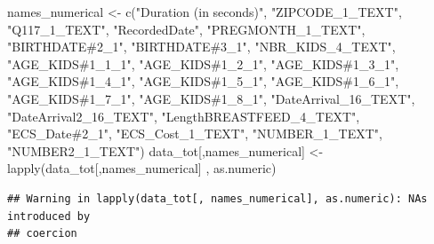 \documentclass[
]{article}
\newenvironment{Shaded}{}{}
\newcommand{\FunctionTok}[1]{\textcolor[rgb]{0.02,0.16,0.49}{#1}}
\newcommand{\NormalTok}[1]{#1}
\newcommand{\OtherTok}[1]{\textcolor[rgb]{0.00,0.44,0.13}{#1}}
\newcommand{\StringTok}[1]{\textcolor[rgb]{0.25,0.44,0.63}{#1}}
\begin{document}
\begin{Shaded}
\begin{Highlighting}[]
\NormalTok{names\_numerical }\OtherTok{\textless{}{-}} \FunctionTok{c}\NormalTok{(}\StringTok{"Duration (in seconds)"}\NormalTok{, }\StringTok{"ZIPCODE\_1\_TEXT"}\NormalTok{, }\StringTok{"Q117\_1\_TEXT"}\NormalTok{, }\StringTok{"RecordedDate"}\NormalTok{, }\StringTok{"PREGMONTH\_1\_TEXT"}\NormalTok{, }
                     \StringTok{"BIRTHDATE\#2\_1"}\NormalTok{, }\StringTok{"BIRTHDATE\#3\_1"}\NormalTok{, }\StringTok{"NBR\_KIDS\_4\_TEXT"}\NormalTok{, }\StringTok{"AGE\_KIDS\#1\_1\_1"}\NormalTok{, }\StringTok{"AGE\_KIDS\#1\_2\_1"}\NormalTok{,}
                     \StringTok{"AGE\_KIDS\#1\_3\_1"}\NormalTok{, }\StringTok{"AGE\_KIDS\#1\_4\_1"}\NormalTok{, }\StringTok{"AGE\_KIDS\#1\_5\_1"}\NormalTok{, }\StringTok{"AGE\_KIDS\#1\_6\_1"}\NormalTok{, }\StringTok{"AGE\_KIDS\#1\_7\_1"}\NormalTok{, }
                     \StringTok{"AGE\_KIDS\#1\_8\_1"}\NormalTok{, }\StringTok{"DateArrival\_16\_TEXT"}\NormalTok{, }\StringTok{"DateArrival2\_16\_TEXT"}\NormalTok{, }\StringTok{"LengthBREASTFEED\_4\_TEXT"}\NormalTok{,}
                     \StringTok{"ECS\_Date\#2\_1"}\NormalTok{, }\StringTok{"ECS\_Cost\_1\_TEXT"}\NormalTok{, }\StringTok{"NUMBER\_1\_TEXT"}\NormalTok{, }\StringTok{"NUMBER2\_1\_TEXT"}\NormalTok{)}
\NormalTok{data\_tot[,names\_numerical] }\OtherTok{\textless{}{-}} \FunctionTok{lapply}\NormalTok{(data\_tot[,names\_numerical] , as.numeric)}
\end{Highlighting}
\end{Shaded}

\begin{verbatim}
## Warning in lapply(data_tot[, names_numerical], as.numeric): NAs introduced by
## coercion
\end{verbatim}
\end{document}
